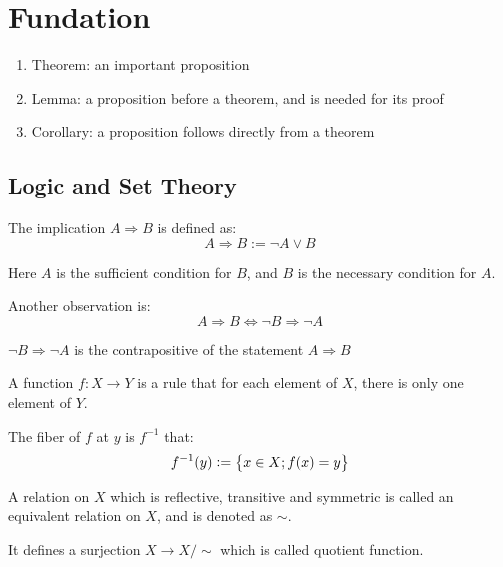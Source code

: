 \chapter{Fundation}


\begin{enumerate}
    \item Theorem: an important proposition
    \item Lemma: a proposition before a theorem, and is needed for its proof
    \item Corollary: a proposition follows directly from a theorem
\end{enumerate}







\section{Logic and Set Theory}


\begin{definition}    
The implication $A \Rightarrow B$ is defined as:
\begin{equation}
    A \Rightarrow B := \neg A \vee B
\end{equation}

Here $A$ is the sufficient condition for $B$, and $B$ is the necessary condition for $A$.

Another observation is:
\begin{equation}
    A \Rightarrow B \Leftrightarrow \neg B \Rightarrow \neg A
\end{equation}

$\neg B \Rightarrow \neg A$ is the contrapositive of the statement $A \Rightarrow B$
\end{definition}

\begin{definition}
    A function $f : X \rightarrow Y$ is a rule that for each element of $X$, there is only one element of $Y$.
\end{definition}

\begin{definition}[\label{fiber}]
    The fiber of $f$ at $y$ is $f^{-1}$ that:
    \begin{equation}
        f^{-1}(y) := \set{x \in X; f(x) = y}
    \end{equation}
\end{definition}

\begin{definition}
    A relation on $X$ which is reflective, transitive and symmetric is called an equivalent relation on $X$, and is denoted as $\sim$.
    
    It defines a surjection $X \rightarrow X / \sim$ which is called quotient function.
\end{definition}



